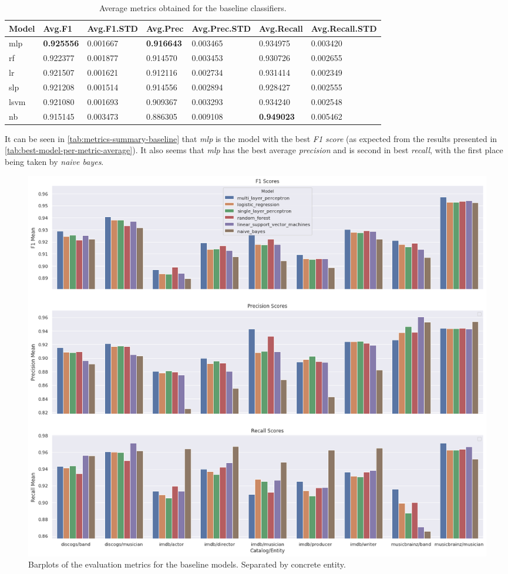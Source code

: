 \documentclass[epsfig,a4paper,11pt,titlepage,twoside,openany]{book}
\begin{document}
\begin{table}[H]
\centering
\begin{tabular}{l|l|l|l|l|l|l}
Model & Avg.F1   & Avg.F1.STD & Avg.Prec & Avg.Prec.STD & Avg.Recall & Avg.Recall.STD \\ \hline
mlp   & \textbf{0.925556} & 0.001667   & \textbf{0.916643} & 0.003465     & 0.934975   & 0.003420       \\
rf    & 0.922377 & 0.001877   & 0.914570 & 0.003453     & 0.930726   & 0.002655       \\
lr    & 0.921507 & 0.001621   & 0.912116 & 0.002734     & 0.931414   & 0.002349       \\
slp   & 0.921208 & 0.001514   & 0.914556 & 0.002894     & 0.928427   & 0.002555       \\
lsvm  & 0.921080 & 0.001693   & 0.909367 & 0.003293     & 0.934240   & 0.002548       \\
nb    & 0.915145 & 0.003473   & 0.886305 & 0.009108     & \textbf{0.949023}   & 0.005462          
\end{tabular}
\caption{Average metrics obtained for the baseline classifiers.}
\label{tab:metrics-summary-baseline}
\end{table}


It can be seen in \autoref{tab:metrics-summary-baseline} that \textit{mlp} is the model with the best \textit{F1 score} (as expected from the results presented in \autoref{tab:best-model-per-metric-average}). It also seems that \textit{mlp} has the best average \textit{precision} and is second in best \textit{recall}, with the first place being taken by \textit{naive bayes}.

\begin{figure}[H]
  \centering \includegraphics[width=\textwidth]{baseline_evluation_main_metrics_barplot_bigger} 
  \caption{Barplots of the evaluation metrics for the baseline models. Separated by concrete entity.}
  \label{fig:baseline-evaluation-barplots}
\end{figure}
\end{document}
